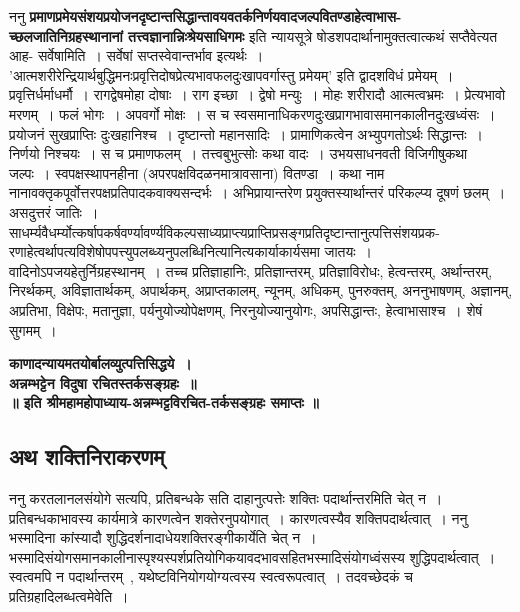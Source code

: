 		ननु {\bfseries प्रमाणप्रमेयसंशयप्रयोजनदृष्टान्तसिद्धान्तावयवतर्कनिर्णयवादजल्पवितण्डाहेत्वाभास\-- च्छलजातिनिग्रहस्थानानां तत्त्वज्ञानान्निःश्रेयसाधिगमः} इति न्यायसूत्रे षोडशपदार्थानामुक्तत्वात्कथं सप्तैवेत्यत आह- सर्वेषामिति~। सर्वेषां सप्तस्वेवान्तर्भाव इत्यर्थः~। ’आत्मशरीरेन्द्रियार्थबुद्धिमनःप्रवृत्तिदोषप्रेत्यभावफलदुःखापवर्गास्तु प्रमेयम्’ इति द्वादशविधं प्रमेयम्~। प्रवृत्तिर्धर्माधर्मौ~। रागद्वेषमोहा दोषाः~। राग इच्छा~। द्वेषो मन्युः~। मोहः शरीरादौ आत्मत्वभ्रमः~। प्रेत्यभावो मरणम्~। फलं भोगः~। अपवर्गो मोक्षः~। स च स्वसमानाधिकरणदुःखप्रागभावासमानकालीनदुःखध्वंसः~। प्रयोजनं सुखप्राप्तिः दुःखहानिश्च~। दृष्टान्तो महानसादिः~। प्रामाणिकत्वेन अभ्युपगतोऽर्थः सिद्धान्तः~। निर्णयो निश्चयः~। स च प्रमाणफलम्~। तत्त्वबुभुत्सोः कथा वादः~। उभयसाधनवती विजिगीषुकथा जल्पः~। स्वपक्षस्थापनहीना (अपरपक्षविदळनमात्रावसाना) वितण्डा~। कथा नाम नानावक्तृकपूर्वोत्तरपक्षप्रतिपादकवाक्यसन्दर्भः~। अभिप्रायान्तरेण प्रयुक्तस्यार्थान्तरं परिकल्प्य दूषणं छलम्~। असदुत्तरं जातिः~। साधर्म्यवैधर्म्योत्कर्षापकर्षवर्ण्यावर्ण्यविकल्पसाध्यप्राप्त्यप्राप्तिप्रसङ्गप्रतिदृष्टान्तानुत्पत्तिसंशयप्रक\-- रणाहेत्वर्थापत्यविशेषोपपत्त्युपलब्ध्यनुपलब्धिनित्यानित्यकार्याकार्यसमा जातयः~। वादिनोऽपजयहेतुर्निग्रहस्थानम्~। तच्च प्रतिज्ञाहानिः, प्रतिज्ञान्तरम्, प्रतिज्ञाविरोधः, हेत्वन्तरम्, अर्थान्तरम्, निरर्थकम्, अविज्ञातार्थकम्, अपार्थकम्, अप्राप्तकालम्, न्यूनम्, अधिकम्, पुनरुक्तम्, अननुभाषणम्, अज्ञानम्, अप्रतिभा, विक्षेपः, मतानुज्ञा, पर्यनुयोज्योपेक्षणम्, निरनुयोज्यानुयोगः, अपसिद्धान्तः, हेत्वाभासाश्च~। शेषं सुगमम्~।
		\begin{center} {\bfseries काणादन्यायमतयोर्बालव्युत्पत्तिसिद्धये~।\\ अन्नम्भट्टेन विदुषा रचितस्तर्कसङ्ग्रहः~॥\\[10pt]॥ इति श्रीमहामहोपाध्याय-अन्नम्भट्टविरचित-तर्कसङ्ग्रहः समाप्तः ॥}\end{center}
\subsection*{अथ शक्तिनिराकरणम्}
		ननु करतलानलसंयोगे सत्यपि, प्रतिबन्धके सति दाहानुत्पत्तेः शक्तिः पदार्थान्तरमिति चेत् न~। प्रतिबन्धकाभावस्य कार्यमात्रे कारणत्वेन शक्तेरनुपयोगात्~। कारणत्वस्यैव शक्तिपदार्थत्वात्~। ननु भस्मादिना कांस्यादौ शुद्धिदर्शनादाधेयशक्तिरङ्गीकार्येति चेत् न~। भस्मादिसंयोगसमानकालीनास्पृश्यस्पर्शप्रतियोगिकयावदभावसहितभस्मादिसंयोगध्वंसस्य शुद्धिपदार्थत्वात्~। स्वत्वमपि न पदार्थान्तरम्~, यथेष्टविनियोगयोग्यत्वस्य स्वत्वरूपत्वात्~। तदवच्छेदकं च प्रतिग्रहादिलब्धत्वमेवेति~।
